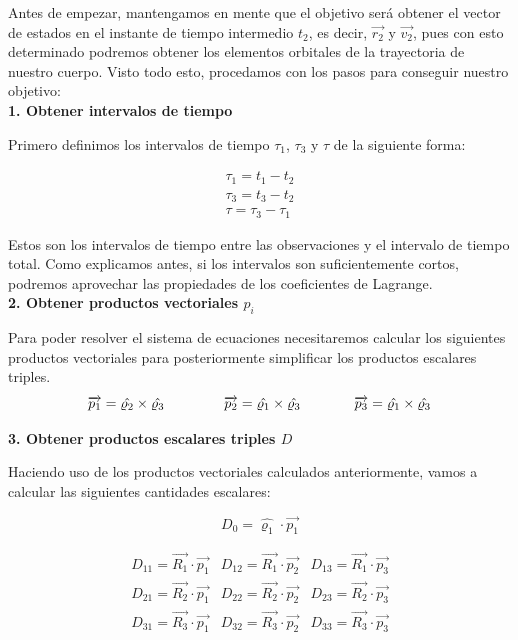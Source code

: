 \documentclass{article}
\numberwithin{equation}{section}
\begin{document}
Antes de empezar, mantengamos en mente que el objetivo será obtener el vector de estados en el instante de tiempo intermedio $t_2$, es decir, $\overrightarrow{r_2}$ y $\overrightarrow{v_2}$, pues con esto determinado podremos obtener los elementos orbitales de la trayectoria de nuestro cuerpo. Visto todo esto, procedamos con los pasos para conseguir nuestro objetivo:\\

\noindent\textbf{1. Obtener intervalos de tiempo}

Primero definimos los intervalos de tiempo $\tau_1$, $\tau_3$ y $\tau$ de la siguiente forma:

\begin{align}
    \tau_1= t_1-t_2 \\
    \tau_3= t_3-t_2 \\
    \tau= \tau_3-\tau_1
\end{align}

Estos son los intervalos de tiempo entre las observaciones y el intervalo de tiempo total. Como explicamos antes, si los intervalos son suficientemente cortos, podremos aprovechar las propiedades de los coeficientes de Lagrange.\\

\newpage
\noindent\textbf{2. Obtener productos vectoriales $p_i$}

Para poder resolver el sistema de ecuaciones necesitaremos calcular los siguientes productos vectoriales para posteriormente simplificar los productos escalares triples.
\begin{align}
    \overrightarrow{p_1}=\hat{\varrho_2}\times\hat{\varrho_3} \hspace{1.5cm} & \overrightarrow{p_2}=\hat{\varrho_1}\times\hat{\varrho_3} \hspace{1cm} & \overrightarrow{p_3}=\hat{\varrho_1}\times\hat{\varrho_3}
\end{align}

\noindent\textbf{3. Obtener productos escalares triples $D$}

Haciendo uso de los productos vectoriales calculados anteriormente, vamos a calcular las siguientes cantidades escalares:

\begin{equation}
    D_0=\hat{\varrho_1}\cdot\overrightarrow{p_1}
\end{equation}

\begin{equation}
\begin{array}{ccc}
D_{11} = \overrightarrow{R_1} \cdot \overrightarrow{p_1} & D_{12} = \overrightarrow{R_1} \cdot \overrightarrow{p_2} & D_{13} = \overrightarrow{R_1} \cdot \overrightarrow{p_3} \\
D_{21} = \overrightarrow{R_2} \cdot \overrightarrow{p_1} & D_{22} = \overrightarrow{R_2} \cdot \overrightarrow{p_2} & D_{23} = \overrightarrow{R_2} \cdot \overrightarrow{p_3} \\
D_{31} = \overrightarrow{R_3} \cdot \overrightarrow{p_1} & D_{32} = \overrightarrow{R_3} \cdot \overrightarrow{p_2} & D_{33} = \overrightarrow{R_3} \cdot \overrightarrow{p_3}
\end{array}
\end{equation}
\end{document}
